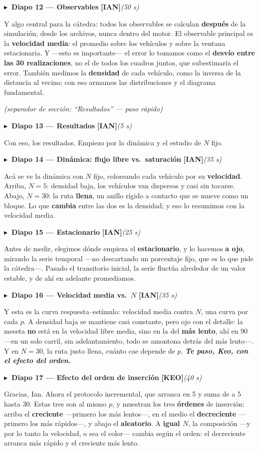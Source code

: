 \documentclass[11pt,a4paper]{article}
\newcommand{\diapo}[5]{%
  \medskip\par\noindent
  \textcolor{#4}{\textbf{$\blacktriangleright$\ Diapo #1 --- #2}}\quad
  \textcolor{#4}{\textbf{[#3]}}\hfill{\itshape\small(#5)}\par\nobreak\smallskip
}
\newcommand{\relevo}[1]{\hfill\textbf{\itshape #1}}
\newcommand{\seccion}[1]{\smallskip\par\noindent\textit{(separador de sección: ``#1'' --- paso rápido)}\par}
\begin{document}
\diapo{12}{Observables}{IAN}{cian}{50 s}
Y algo central para la cátedra: todos los observables se calculan \textbf{después} de la simulación, desde
los archivos, nunca dentro del motor. El observable principal es la \textbf{velocidad media}: el promedio
sobre los vehículos y sobre la ventana estacionaria. Y ---esto es importante--- el error lo tomamos como el
\textbf{desvío entre las 30 realizaciones}, no el de todos los cuadros juntos, que subestimaría el error.
También medimos la \textbf{densidad} de cada vehículo, como la inversa de la distancia al vecino; con eso
armamos las distribuciones y el diagrama fundamental.

\seccion{Resultados}
\diapo{13}{Resultados}{IAN}{cian}{5 s}
Con eso, los resultados. Empiezo por la dinámica y el estudio de $N$ fijo.

\diapo{14}{Dinámica: flujo libre vs.\ saturación}{IAN}{cian}{35 s}
Acá se ve la dinámica con $N$ fijo, coloreando cada vehículo por su \textbf{velocidad}. Arriba,
\textbf{$N=5$}: densidad baja, los vehículos van dispersos y casi sin tocarse. Abajo, \textbf{$N=30$}: la
ruta \textbf{llena}, un anillo rígido a contacto que se mueve como un bloque. Lo que \textbf{cambia} entre
las dos es la densidad; y eso lo resumimos con la velocidad media.

\diapo{15}{Estacionario}{IAN}{cian}{25 s}
Antes de medir, elegimos dónde empieza el \textbf{estacionario}, y lo hacemos \textbf{a ojo}, mirando la
serie temporal ---no descartando un porcentaje fijo, que es lo que pide la cátedra---. Pasado el
transitorio inicial, la serie fluctúa alrededor de un valor estable, y de ahí en adelante promediamos.

\diapo{16}{Velocidad media vs.\ $N$}{IAN}{cian}{35 s}
Y esta es la curva respuesta--estímulo: velocidad media contra $N$, una curva por cada $p$. A densidad baja
se mantiene casi constante, pero ojo con el detalle: la meseta \textbf{no} está en la velocidad libre media,
sino en la del \textbf{más lento}, ahí en 90 ---en un solo carril, sin adelantamiento, todo se amontona
detrás del más lento---. Y en $N=30$, la ruta justo llena, cuánto cae depende de $p$. \relevo{Te paso, Keo,
con el efecto del orden.}

\diapo{17}{Efecto del orden de inserción}{KEO}{ckeo}{40 s}
Gracias, Ian. Ahora el protocolo incremental, que arranca en 5 y suma de a 5 hasta 30. Estas tres son al
mismo $p$, y muestran los tres \textbf{órdenes} de inserción: arriba el \textbf{creciente} ---primero los
más lentos---, en el medio el \textbf{decreciente} ---primero los más rápidos---, y abajo el
\textbf{aleatorio}. A \textbf{igual $N$}, la composición ---y por lo tanto la velocidad, o sea el color---
cambia según el orden: el decreciente arranca más rápido y el creciente más lento.
\end{document}
